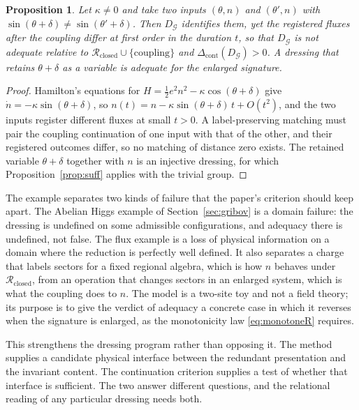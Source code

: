 \documentclass[11pt]{article}
\theoremstyle{plain}
\newtheorem{proposition}{Proposition}
\theoremstyle{definition}
\theoremstyle{remark}
\newcommand{\G}{\mathcal G}
\newcommand{\R}{\mathcal R}
\begin{document}
\begin{proposition}\label{prop:flux}
Let $\kappa\neq0$ and take two inputs $(\theta,n)$ and $(\theta',n)$ with $\sin(\theta+\delta)\neq\sin(\theta'+\delta)$. Then $D_\G$ identifies them, yet the registered fluxes after the coupling differ at first order in the duration $t$, so that $D_\G$ is not adequate relative to $\R_{\mathrm{closed}}\cup\{\text{coupling}\}$ and $\Delta_{\mathrm{cont}}(D_\G)>0$. A dressing that retains $\theta+\delta$ as a variable is adequate for the enlarged signature.
\end{proposition}
\begin{proof}
Hamilton's equations for $H=\tfrac12e^2n^2-\kappa\cos(\theta+\delta)$ give $\dot n=-\kappa\sin(\theta+\delta)$, so $n(t)=n-\kappa\sin(\theta+\delta)\,t+O(t^2)$, and the two inputs register different fluxes at small $t>0$. A label-preserving matching must pair the coupling continuation of one input with that of the other, and their registered outcomes differ, so no matching of distance zero exists. The retained variable $\theta+\delta$ together with $n$ is an injective dressing, for which Proposition~\ref{prop:suff} applies with the trivial group.
\end{proof}

The example separates two kinds of failure that the paper's criterion should keep apart. The Abelian Higgs example of Section~\ref{sec:gribov} is a domain failure: the dressing is undefined on some admissible configurations, and adequacy there is undefined, not false. The flux example is a loss of physical information on a domain where the reduction is perfectly well defined. It also separates a charge that labels sectors for a fixed regional algebra, which is how $n$ behaves under $\R_{\mathrm{closed}}$, from an operation that changes sectors in an enlarged system, which is what the coupling does to $n$. The model is a two-site toy and not a field theory; its purpose is to give the verdict of adequacy a concrete case in which it reverses when the signature is enlarged, as the monotonicity law \eqref{eq:monotoneR} requires.

This strengthens the dressing program rather than opposing it. The method supplies a candidate physical interface between the redundant presentation and the invariant content. The continuation criterion supplies a test of whether that interface is sufficient. The two answer different questions, and the relational reading of any particular dressing needs both.
\end{document}
